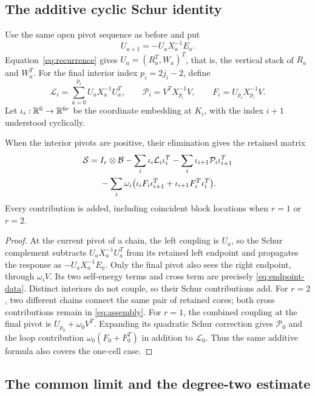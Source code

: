\subsection{The additive cyclic Schur identity}

Use the same open pivot sequence as before and put
\[
 U_{a+1}=-U_aX_a^{-1}E_a.
\]
Equation~\eqref{eq:recurrence} gives $U_a=(R_a^T,W_a)^T$,
that is, the vertical stack of $R_a$ and $W_a^T$.
For the final interior index $p_i=2j_i-2$, define
\begin{equation}
 \mathcal L_i=\sum_{a=0}^{p_i}U_aX_a^{-1}U_a^T,
 \qquad \mathcal P_i=V^TX_{p_i}^{-1}V,
 \qquad F_i=U_{p_i}X_{p_i}^{-1}V.
 \label{eq:endpoint-data}
\end{equation}
Let $\iota_i:\mathbb R^6\to\mathbb R^{6r}$ be the coordinate embedding at $K_i$,
with the index $i+1$ understood cyclically.

\begin{lemma}\label{lem:assembly}
When the interior pivots are positive, their elimination gives the retained
matrix
\begin{align}
 \mathcal S={}&I_r\otimes\mathcal B
 -\sum_i\iota_i\mathcal L_i\iota_i^T
 -\sum_i\iota_{i+1}\mathcal P_i\iota_{i+1}^T\notag\\
 &-\sum_i\omega_i\bigl(
 \iota_iF_i\iota_{i+1}^T+\iota_{i+1}F_i^T\iota_i^T\bigr).
 \label{eq:assembly}
\end{align}
Every contribution is added, including coincident block locations when
$r=1$ or $r=2$.
\end{lemma}
\begin{proof}
At the current pivot of a chain, the left coupling is $U_a$, so the Schur
complement subtracts $U_aX_a^{-1}U_a^T$ from its retained left endpoint
and propagates the response as $-U_aX_a^{-1}E_a$.
Only the final pivot also sees the right endpoint, through $\omega_iV$.
Its two self-energy terms and cross term are precisely
\eqref{eq:endpoint-data}. Distinct interiors do not couple, so their
Schur contributions add.
For $r=2$, two different chains connect the same pair of retained cores;
both cross contributions remain in \eqref{eq:assembly}.
For $r=1$, the combined coupling at the final pivot is
$U_{p_0}+\omega_0V^T$. Expanding its quadratic Schur correction gives
$\mathcal P_0$ and the loop contribution
$\omega_0(F_0+F_0^T)$ in addition to $\mathcal L_0$.
Thus the same additive formula also covers the one-cell case.
\end{proof}

\subsection{The common limit and the degree-two estimate}

